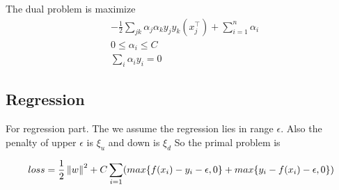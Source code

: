 The dual problem is maximize
\begin{equation}
  \begin{aligned}
    &-\frac{1}{2} \sum_{jk} \alpha_j \alpha_k y_j y_k(x_j^\top) + \sum_{i=1}^n \alpha_i \\
    &0 \leq \alpha_i \leq C \\
    &\sum_i \alpha_i y_i = 0
  \end{aligned}
\end{equation}

\subsection{Regression}
For regression part. The we assume the regression lies in range $\epsilon$. Also the penalty of upper $\epsilon$ is $\xi_u$ and down is $\xi_d$
So the primal problem is

\begin{equation}
  \begin{aligned}
    &loss = \frac{1}{2} \left\lVert w\right\rVert^2 + C\sum_{i=1} (max\{f(x_i) - y_i - \epsilon, 0\}  + max\{y_i - f(x_i) - \epsilon, 0\})\\
  \end{aligned}
\end{equation}
